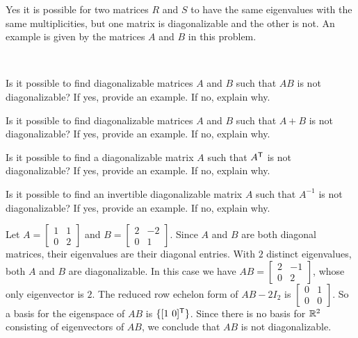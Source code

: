 \begin{example}
\item Yes it is possible for two matrices $R$ and $S$ to have the same eigenvalues with the same multiplicities, but one matrix is diagonalizable and the other is not. An example is given by the matrices $A$ and $B$ in this problem. 

\ea

\end{example}


\begin{example} ~
\ba
\item Is it possible to find diagonalizable matrices $A$ and $B$ such that $AB$ is not diagonalizable? If yes, provide an example. If no, explain why.

\item Is it possible to find diagonalizable matrices $A$ and $B$ such that $A+B$ is not diagonalizable? If yes, provide an example. If no, explain why.

\item Is it possible to find a diagonalizable matrix $A$ such that $A^{\mathsf{T}}$ is not diagonalizable? If yes, provide an example. If no, explain why.

\item Is it possible to find an invertible diagonalizable matrix $A$ such that $A^{-1}$ is not diagonalizable? If yes, provide an example. If no, explain why.

\ea

\ExampleSolution
\ba
\item Let $A = \left[ \begin{array}{cc} 1&1\\0&2 \end{array} \right]$ and $B = \left[ \begin{array}{cr} 2&-2 \\ 0&1 \end{array} \right]$. Since $A$ and $B$ are both diagonal matrices, their eigenvalues are their diagonal entries. With $2$ distinct eigenvalues, both $A$ and $B$ are diagonalizable. In this case we have $AB = \left[ \begin{array}{cr} 2&-1\\0&2 \end{array} \right]$, whose only eigenvector is $2$. The reduced row echelon form of $AB - 2I_2$ is $\left[ \begin{array}{cr} 0&1\\0&0 \end{array} \right]$. So a basis for the eigenspace of $AB$ is $\{[1 \ 0]^{\mathsf{T}}\}$. Since there is no basis for $\mathbb{R}^2$ consisting of eigenvectors of $AB$, we conclude that $AB$ is not diagonalizable.


\end{example}
